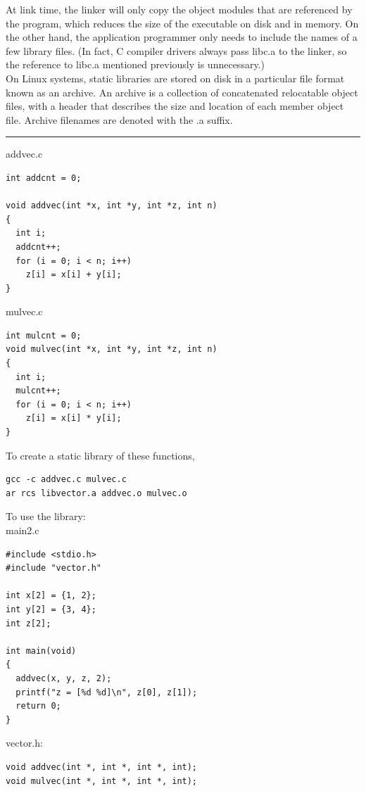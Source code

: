 \documentclass[11pt]{article}
\begin{document}
\begin{enumerate}
At link time, the linker will only copy the object modules that are referenced by the program, which reduces the size of the executable on disk and in memory. On the other hand, the application programmer only needs to include the names of a few library files. (In fact, C compiler drivers always pass libc.a to the linker, so the reference to libc.a mentioned previously is unnecessary.)\\



On Linux systems, static libraries are stored on disk in a particular file format known as an archive. An archive is a collection of concatenated relocatable object files, with a header that describes the size and location of each member object file. Archive filenames are denoted with the .a suffix.\\


\noindent\rule{\textwidth}{0.5pt}
addvec.c\\
\begin{verbatim}
int addcnt = 0;

void addvec(int *x, int *y, int *z, int n)
{
  int i;
  addcnt++;
  for (i = 0; i < n; i++)
    z[i] = x[i] + y[i];
}
\end{verbatim}

mulvec.c\\
\begin{verbatim}
int mulcnt = 0;
void mulvec(int *x, int *y, int *z, int n)
{
  int i;
  mulcnt++;
  for (i = 0; i < n; i++)
    z[i] = x[i] * y[i];
}
\end{verbatim}

To create a static library of these functions,\\
\begin{verbatim}
gcc -c addvec.c mulvec.c
ar rcs libvector.a addvec.o mulvec.o
\end{verbatim}

To use the library:\\
main2.c\\
\begin{verbatim}
#include <stdio.h>
#include "vector.h"

int x[2] = {1, 2};
int y[2] = {3, 4};
int z[2];

int main(void)
{
  addvec(x, y, z, 2);
  printf("z = [%d %d]\n", z[0], z[1]);
  return 0;
}
\end{verbatim}


vector.h:\\
\begin{verbatim}
void addvec(int *, int *, int *, int);
void mulvec(int *, int *, int *, int);
\end{verbatim}


\end{enumerate}
\end{document}

